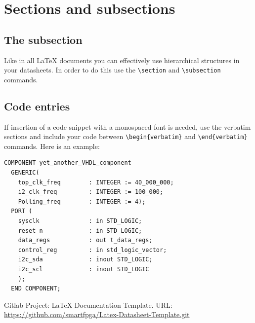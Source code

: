 \documentclass[a4paper, 10pt, onecolumn]{article}
\begin{document}
\section*{Sections and subsections}
\subsection*{The subsection}
Like in all LaTeX documents you can effectively use hierarchical structures in your datasheets. In order to do this use the \verb+\section+ and \verb+\subsection+ commands.
\subsection*{Code entries}
If insertion of a code snippet with a monospaced font is needed, use the verbatim sections and include your code between \verb+\begin{verbatim}+ and \verb+\end{verbatim}+ commands. Here is an example:
\begin{verbatim}
COMPONENT yet_another_VHDL_component
  GENERIC(
    top_clk_freq        : INTEGER := 40_000_000; 
    i2_clk_freq         : INTEGER := 100_000;      
    Polling_freq        : INTEGER := 4);
  PORT (
    sysclk              : in STD_LOGIC;
    reset_n             : in STD_LOGIC;
    data_regs           : out t_data_regs;
    control_reg         : in std_logic_vector;
    i2c_sda             : inout STD_LOGIC;  
    i2c_scl             : inout STD_LOGIC   
    );
  END COMPONENT;
\end{verbatim}

\begin{thebibliography}{3}
Gitlab Project: LaTeX Documentation Template. URL:\\
\url{https://github.com/smartfpga/Latex-Datasheet-Template.git}
\end{thebibliography}
\end{document}
